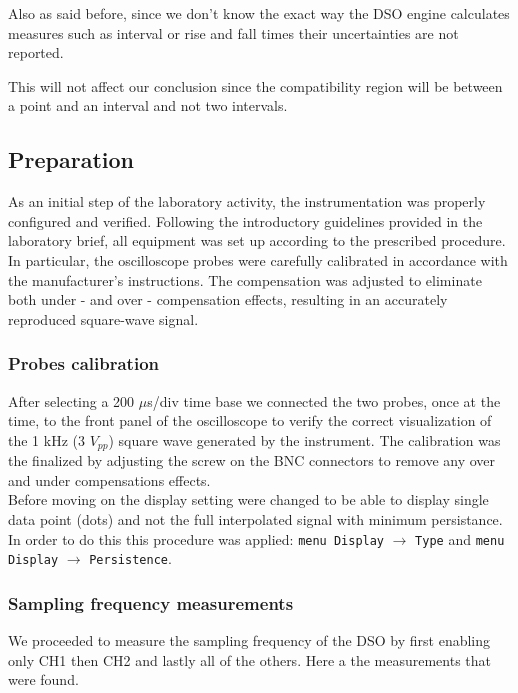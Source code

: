 \documentclass[../main.tex]{subfiles}
\begin{document}
Also as said before, since we don't know the exact way the DSO engine calculates measures such as interval or rise and fall times their uncertainties are not reported.

This will not affect our conclusion since the compatibility region will be between a point and an interval and not two intervals.  

\subsection{Preparation}


As an initial step of the laboratory activity, the instrumentation was properly configured and verified. 
Following the introductory guidelines provided in the laboratory brief, all equipment was set up according to the prescribed procedure. In particular, the oscilloscope probes were carefully calibrated in accordance with the manufacturer's instructions. The compensation was adjusted to eliminate both under - and over - compensation effects, resulting in an accurately reproduced square-wave signal. 


\subsubsection*{Probes calibration}

After selecting a 200 $\mu$s/div time base we connected the two probes, once at the time, to the front panel of the oscilloscope to verify the correct visualization of the 1 kHz (3 $V_{pp}$) square wave generated by the instrument.
The calibration was the finalized by adjusting the screw on the BNC connectors to remove any over and under compensations effects.\\

Before moving on the display setting were changed to be able to display single data point (dots) and not the full interpolated signal with minimum persistance.
In order to do this this procedure was applied: \texttt{menu Display} $\rightarrow$ \texttt{Type} and \texttt{menu Display} $\rightarrow$ \texttt{Persistence}.

\subsubsection*{Sampling frequency measurements}

We proceeded to measure the sampling frequency of the DSO by first enabling only CH1 then CH2 and lastly all of the others.
Here a the measurements that were found.
\end{document}
